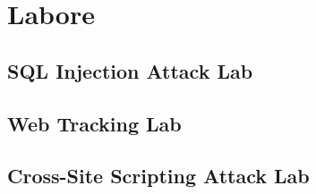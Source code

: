 \appendix
\chapter{Labore}
\section{SQL Injection Attack Lab}
\section{Web Tracking Lab}
\section{Cross-Site Scripting Attack Lab}